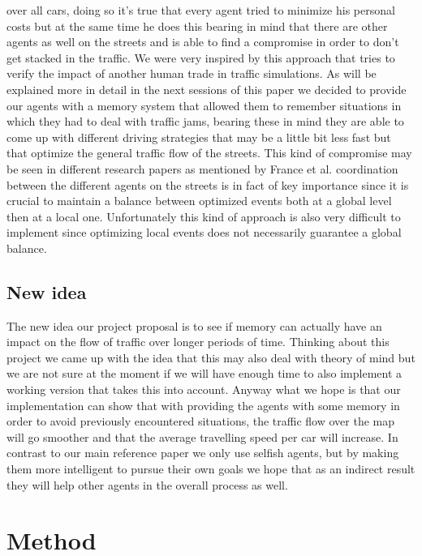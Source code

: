 \documentclass[a4paper,hidelinks]{article}
\begin{document}
over all cars, doing so it's true that every agent tried to minimize his personal costs but at the same time he does this bearing in mind that there are other agents as well on the streets and is able to find a compromise in order to don't get stacked in the traffic. We were very inspired by this approach that tries to verify the impact of another human trade in traffic simulations. As will be explained more in detail in the next sessions of this paper we decided to provide our agents with a memory system that allowed them to remember situations in which they had to deal with traffic jams, bearing these in mind they are able to come up with different driving strategies that may be a little bit less fast but that optimize the general traffic flow of the streets.
This kind of compromise may be seen in different research papers as mentioned by France et al. \cite{france2003multiagent} coordination between the different agents on the streets is in fact of key importance since it is crucial to maintain a balance between optimized events both at a global level then at a local one. Unfortunately this kind of approach is also very difficult to implement since optimizing local events does not necessarily guarantee a global balance.         

\subsection{New idea}
The new idea our project proposal is to see if memory can actually have an impact on the flow of traffic over longer periods of time. Thinking about this project we came up with the idea that this may also deal with theory of mind but we are not sure at the moment if we will have enough time to also implement a working version that takes this into account. Anyway what we hope is that our implementation can show that with providing the agents with some memory in order to avoid previously encountered situations, the traffic flow over the map will go smoother and that the average travelling speed per car will increase. In contrast to our main reference paper \cite{gabel2012cooperative} we only use selfish agents, but by making them more intelligent to pursue their own goals we hope that as an indirect result they will help other agents in the overall process as well.

\section{Method}
\end{document}
